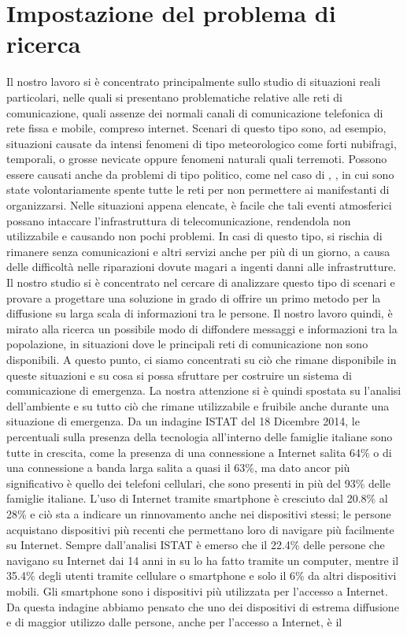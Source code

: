 \chapter{Impostazione del problema di ricerca}
\label{chap:impost_prob_ricerca}

Il nostro lavoro si è concentrato principalmente sullo studio di situazioni reali particolari, nelle quali si presentano problematiche relative alle reti di comunicazione, quali assenze dei normali canali di comunicazione telefonica di rete fissa e mobile, compreso internet. Scenari di questo tipo sono, ad esempio, situazioni causate da intensi fenomeni di tipo meteorologico come forti nubifragi, temporali, o grosse nevicate oppure fenomeni naturali quali terremoti. Possono essere causati anche da problemi di tipo politico, come nel caso di \cite{wemakehistory2014-articolo}, \cite{wemakehistory2014-fattoq}, \cite{wemakehistory2014-lastampa} in cui sono state volontariamente spente tutte le reti per non permettere ai manifestanti di organizzarsi. Nelle situazioni appena elencate, è facile che tali eventi atmosferici possano intaccare l'infrastruttura di telecomunicazione, rendendola non utilizzabile e causando non pochi problemi. In casi di questo tipo, si rischia di rimanere senza comunicazioni e altri servizi anche per più di un giorno, a causa delle difficoltà nelle riparazioni dovute magari a ingenti danni alle infrastrutture. Il nostro studio si è concentrato nel cercare di analizzare questo tipo di scenari e provare a progettare una soluzione in grado di offrire un primo metodo per la diffusione su larga scala di informazioni tra le persone. Il nostro lavoro quindi, è mirato alla ricerca un possibile modo di diffondere messaggi e informazioni tra la popolazione, in situazioni dove le principali reti di comunicazione non sono disponibili. A questo punto, ci siamo concentrati su ciò che rimane disponibile in queste situazioni e su cosa si possa sfruttare per costruire un sistema di comunicazione di emergenza. La nostra attenzione si è quindi spostata su l'analisi dell'ambiente e su tutto ciò che rimane utilizzabile e fruibile anche durante una situazione di emergenza. Da un indagine ISTAT \cite{istat2014} del 18 Dicembre 2014, le percentuali sulla presenza della tecnologia all'interno delle famiglie italiane sono tutte in crescita, come la presenza di una connessione a Internet salita 64\% o di una connessione a banda larga salita a quasi il 63\%, ma dato ancor più significativo è quello dei telefoni cellulari, che sono presenti in più del 93\% delle famiglie italiane. L'uso di Internet tramite smartphone è cresciuto dal 20.8\% al 28\% e ciò sta a indicare un rinnovamento anche nei dispositivi stessi; le persone acquistano dispositivi più recenti che permettano loro di navigare più facilmente su Internet. Sempre dall'analisi ISTAT è emerso che il 22.4\% delle persone che navigano su Internet dai 14 anni in su lo ha fatto tramite un computer, mentre il 35.4\% degli utenti tramite cellulare o smartphone e solo il 6\% da altri dispositivi mobili. Gli smartphone sono i dispositivi più utilizzata per l'accesso a Internet. Da questa indagine abbiamo pensato che uno dei dispositivi di estrema diffusione e di maggior utilizzo dalle persone, anche per l'accesso a Internet, è il 